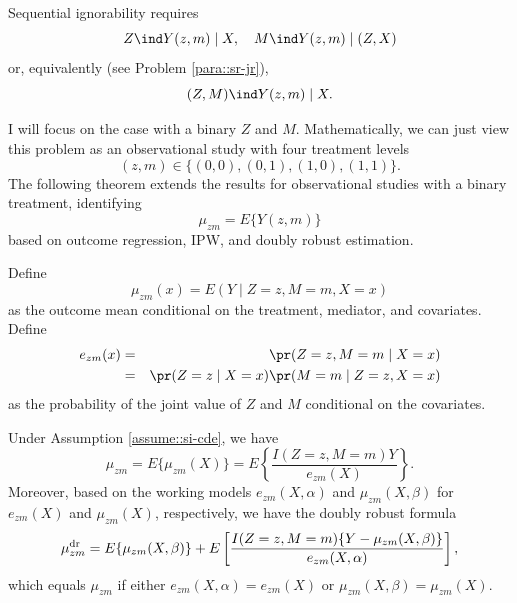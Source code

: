 \begin{assumption}\label{assume::si-cde}
Sequential ignorability requires
$$
Z\ind Y(z,m) \mid X, \quad M \ind  Y(z,m) \mid (Z,X)
$$
or, equivalently (see Problem \ref{para::sr-jr}),
$$
(Z,M) \ind  Y(z,m) \mid X.
$$
\end{assumption}

I will focus on the case with a binary $Z$ and $M$. 
Mathematically, we can just view this problem as an observational study with four treatment levels 
$$
(z,m) \in \{  (0,0), (0,1), (1,0), (1,1) \} .
$$
The following theorem extends the results for observational studies with a binary treatment, identifying
$$
\mu_{zm} = E\{  Y(z,m) \}
$$
based on outcome regression, IPW, and doubly robust estimation. 


Define 
$$ 
\mu_{zm}(x) = E(Y\mid Z=z,M=m, X=x) 
$$
 as the outcome mean conditional on the treatment, mediator, and covariates. Define 
\begin{eqnarray*}
e_{zm}(x)  &=&  \pr(Z=z,M=m\mid X=x)  \\
&=& \pr(Z=z\mid X=x) \pr( M=m\mid Z=z, X=x)
\end{eqnarray*} 
as the probability of the joint value of $Z$ and $M$ conditional on the covariates. 

\begin{theorem}
\label{thm::cde-identification}
Under Assumption \ref{assume::si-cde}, we have
$$
\mu_{zm} = E\{  \mu_{zm}(X) \}
= E \left\{   \frac{I(Z=z, M=m) Y}{  e_{zm}(X)  }  \right\} .
$$
Moreover, based on the working models $e_{zm}(X, \alpha) $ and $\mu_{zm}(X, \beta) $ for $e_{zm}(X) $ and $\mu_{zm}(X) $, respectively, we have the doubly robust   formula 
$$
\mu_{zm}^{\textup{dr}}  = E\{  \mu_{zm}(X, \beta) \} + E \left[   \frac{I(Z=z, M=m) \{ Y - \mu_{zm}(X, \beta)  \}}{  e_{zm}(X, \alpha)  }  \right],
$$
which equals $\mu_{zm} $ if either $e_{zm}(X, \alpha) = e_{zm}(X)$ or $\mu_{zm}(X, \beta)  = \mu_{zm}(X)$. 
\end{theorem}



